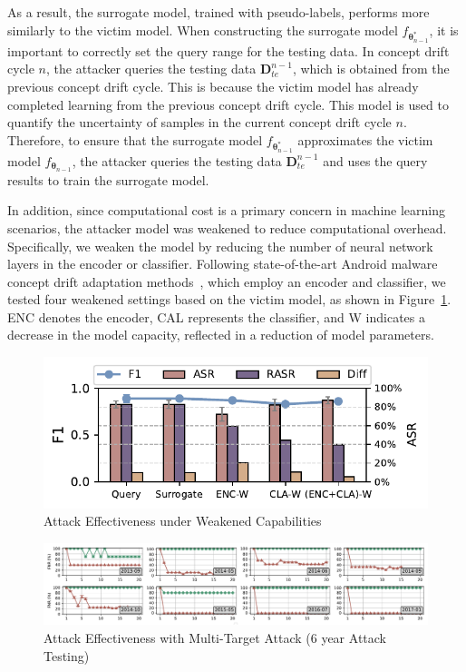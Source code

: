 \documentclass[conference,compsoc]{IEEEtran} %
\begin{document}
As a result, the surrogate model, trained with pseudo-labels, performs more similarly to the victim model.
When constructing the surrogate model $f_{\bm{\theta}_{n-1}^{*}}$, it is important to correctly set the query range for the testing data.
In concept drift cycle $n$, the attacker queries the testing data $\bm{D}_{te}^{n-1}$, which is obtained from the previous concept drift cycle.
This is because the victim model has already completed learning from the previous concept drift cycle.
This model is used to quantify the uncertainty of samples in the current concept drift cycle $n$.
Therefore, to ensure that the surrogate model $f_{\bm{\theta}_{n-1}^{*}}$ approximates the victim model $f_{\bm{\theta}_{n-1}}$, the attacker queries the testing data $\bm{D}_{te}^{n-1}$ and uses the query results to train the surrogate model.

In addition, since computational cost is a primary concern in machine learning scenarios, the attacker  model was weakened to reduce computational overhead.
Specifically, we weaken the model by reducing the number of neural network layers in the encoder or classifier.
Following state-of-the-art Android malware concept drift adaptation methods~\cite{2023-Usenix-chenyizhen}, which employ an encoder and classifier, we tested four weakened settings based on the victim model, as shown in Figure~\ref{fig:Attack-effectiveness-model-heterogeneity}.
ENC denotes the encoder, CAL represents the classifier, and W indicates a decrease in the model  capacity, reflected in a reduction of model parameters.

\begin{figure}[h!]
	\centering
	\includegraphics[width=\linewidth,keepaspectratio]{Graph/Evaluation/Figure10_1.pdf}
	\caption{Attack Effectiveness under Weakened Capabilities}
	\label{fig:Attack-effectiveness-model-heterogeneity}
\end{figure}
\begin{figure}[t]
	\centering
	\includegraphics[width=\linewidth,keepaspectratio]{Graph/Evaluation/api_multi_attackers_fnr_1.pdf}
	\caption{Attack Effectiveness with Multi-Target Attack (6 year Attack Testing)}
	\label{fig: Attack Effectiveness with Multi-Target Attack}
\end{figure}
\end{document}
